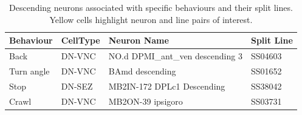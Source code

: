     \begin{table}[ht]
        \centering
        \begin{tabular}{l l p{} l}
            \toprule
            \textbf{Behaviour} & \textbf{CellType} & \textbf{Neuron Name} & \textbf{Split Line} \\
            \midrule
            Back & DN-VNC & \cellcolor{cxhl} NO.d DPMI\_ant\_ven descending 3 & \cellcolor{cxhl} SS04603 \\
            Turn angle & DN-VNC & \cellcolor{cxhl} BAmd descending & \cellcolor{cxhl} SS01652 \\
            Stop & DN-SEZ & \cellcolor{cxhl} MB2IN-172 DPLc1 Descending & \cellcolor{cxhl} SS38042 \\
            Crawl & DN-VNC & \cellcolor{cxhl} MB2ON-39 ipsigoro & \cellcolor{cxhl} SS03731 \\
            \bottomrule
        \end{tabular}
        \caption[Behaviour of CX Descending Neurons]{Descending neurons associated with specific behaviours and their split lines. Yellow cells highlight neuron and line pairs of interest.}
        \label{behaviourCXdescending}
    \end{table}







